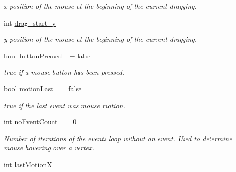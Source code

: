 \begin{DoxyCompactItemize}
\begin{DoxyCompactList}\small\item\em x-\/position of the mouse at the beginning of the current dragging. \end{DoxyCompactList}\item 
int \hyperlink{structslb_1_1core_1_1ui_1_1Visualizer_abc1337a1e4aeca79832fa6179a8b9ad9}{drag\+\_\+start\+\_\+y}\hypertarget{structslb_1_1core_1_1ui_1_1Visualizer_abc1337a1e4aeca79832fa6179a8b9ad9}{}\label{structslb_1_1core_1_1ui_1_1Visualizer_abc1337a1e4aeca79832fa6179a8b9ad9}

\begin{DoxyCompactList}\small\item\em y-\/position of the mouse at the beginning of the current dragging. \end{DoxyCompactList}\item 
bool \hyperlink{structslb_1_1core_1_1ui_1_1Visualizer_aae4190c9a99d426b9374fa22d7472b21}{button\+Pressed\+\_\+} = false\hypertarget{structslb_1_1core_1_1ui_1_1Visualizer_aae4190c9a99d426b9374fa22d7472b21}{}\label{structslb_1_1core_1_1ui_1_1Visualizer_aae4190c9a99d426b9374fa22d7472b21}

\begin{DoxyCompactList}\small\item\em {\ttfamily true} if a mouse button has been pressed. \end{DoxyCompactList}\item 
bool \hyperlink{structslb_1_1core_1_1ui_1_1Visualizer_a77bc895040cc8bcdea4f07aabcd62dd9}{motion\+Last\+\_\+} = false\hypertarget{structslb_1_1core_1_1ui_1_1Visualizer_a77bc895040cc8bcdea4f07aabcd62dd9}{}\label{structslb_1_1core_1_1ui_1_1Visualizer_a77bc895040cc8bcdea4f07aabcd62dd9}

\begin{DoxyCompactList}\small\item\em {\ttfamily true} if the last event was mouse motion. \end{DoxyCompactList}\item 
int \hyperlink{structslb_1_1core_1_1ui_1_1Visualizer_a1462915618a9a86765383f2addbcdaba}{no\+Event\+Count\+\_\+} = 0\hypertarget{structslb_1_1core_1_1ui_1_1Visualizer_a1462915618a9a86765383f2addbcdaba}{}\label{structslb_1_1core_1_1ui_1_1Visualizer_a1462915618a9a86765383f2addbcdaba}

\begin{DoxyCompactList}\small\item\em Number of iterations of the events loop without an event. Used to determine mouse hovering over a vertex. \end{DoxyCompactList}\item 
int \hyperlink{structslb_1_1core_1_1ui_1_1Visualizer_a30a7ce4d0691123d483514ba2f5b2b5c}{last\+Motion\+X\+\_\+}\hypertarget{structslb_1_1core_1_1ui_1_1Visualizer_a30a7ce4d0691123d483514ba2f5b2b5c}{}\label{structslb_1_1core_1_1ui_1_1Visualizer_a30a7ce4d0691123d483514ba2f5b2b5c}


\end{DoxyCompactItemize}
